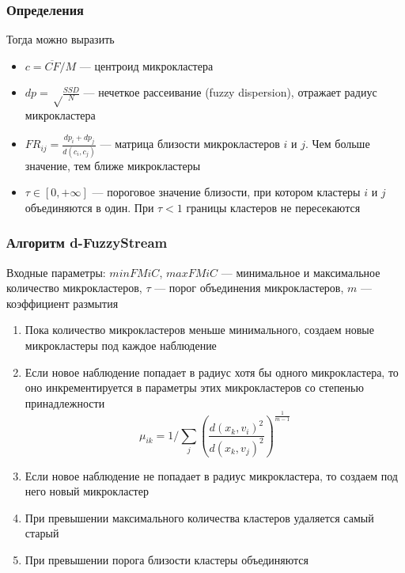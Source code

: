 \documentclass{beamer}
\begin{document}
\begin{frame}
    \frametitle{Определения}
    
    Тогда можно выразить
    \begin{itemize}
        \item $c = \overline{CF}/M$ --- центроид микрокластера
        \item $dp = \sqrt \frac{SSD}{N}$ --- нечеткое рассеивание (fuzzy dispersion), отражает радиус микрокластера
        \item $FR_{ij} = \frac{dp_i + dp_j}{d(c_i, c_j)}$ --- матрица близости микрокластеров $i$ и $j$. Чем больше значение, тем ближе микрокластеры
        \item  $\tau \in [0, +\infty]$ --- пороговое значение близости, при котором кластеры $i$ и $j$ объединяются в один. При $\tau < 1$ границы кластеров не пересекаются
    \end{itemize}
    
\end{frame}

\begin{frame}
    \frametitle{Алгоритм d-FuzzyStream}
    
    Входные параметры:
    $minFMiC$, $maxFMiC$ --- минимальное и максимальное количество микрокластеров, $\tau$ --- порог объединения микрокластеров, $m$ --- коэффициент размытия
    
    \begin{enumerate}
        \item Пока количество микрокластеров меньше минимального, создаем новые микрокластеры под каждое наблюдение
        \item Если новое наблюдение попадает в радиус хотя бы одного микрокластера, то оно инкрементируется в параметры этих микрокластеров со степенью принадлежности
        $$\mu_{ik} = 1 / \sum_j \left( \frac{d(x_k, v_i)^2}{d(x_k, v_j)^2} \right)^{\frac{1}{m-1}}$$
        \item Если новое наблюдение не попадает в радиус микрокластера, то создаем под него новый микрокластер
        \item При превышении максимального количества кластеров удаляется самый старый
        \item При превышении порога близости кластеры объединяются
    \end{enumerate}
    
\end{frame}
\end{document}
